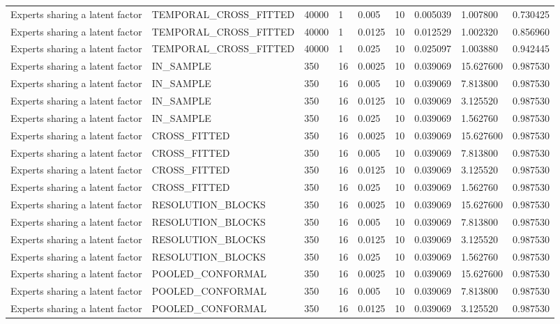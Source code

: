 \begin{tabular}{lllllllll}
Experts sharing a latent factor & TEMPORAL\_CROSS\_FITTED & 40000 & 1 & 0.005 & 10 & 0.005039 & 1.007800 & 0.730425 \\
Experts sharing a latent factor & TEMPORAL\_CROSS\_FITTED & 40000 & 1 & 0.0125 & 10 & 0.012529 & 1.002320 & 0.856960 \\
Experts sharing a latent factor & TEMPORAL\_CROSS\_FITTED & 40000 & 1 & 0.025 & 10 & 0.025097 & 1.003880 & 0.942445 \\
Experts sharing a latent factor & IN\_SAMPLE & 350 & 16 & 0.0025 & 10 & 0.039069 & 15.627600 & 0.987530 \\
Experts sharing a latent factor & IN\_SAMPLE & 350 & 16 & 0.005 & 10 & 0.039069 & 7.813800 & 0.987530 \\
Experts sharing a latent factor & IN\_SAMPLE & 350 & 16 & 0.0125 & 10 & 0.039069 & 3.125520 & 0.987530 \\
Experts sharing a latent factor & IN\_SAMPLE & 350 & 16 & 0.025 & 10 & 0.039069 & 1.562760 & 0.987530 \\
Experts sharing a latent factor & CROSS\_FITTED & 350 & 16 & 0.0025 & 10 & 0.039069 & 15.627600 & 0.987530 \\
Experts sharing a latent factor & CROSS\_FITTED & 350 & 16 & 0.005 & 10 & 0.039069 & 7.813800 & 0.987530 \\
Experts sharing a latent factor & CROSS\_FITTED & 350 & 16 & 0.0125 & 10 & 0.039069 & 3.125520 & 0.987530 \\
Experts sharing a latent factor & CROSS\_FITTED & 350 & 16 & 0.025 & 10 & 0.039069 & 1.562760 & 0.987530 \\
Experts sharing a latent factor & RESOLUTION\_BLOCKS & 350 & 16 & 0.0025 & 10 & 0.039069 & 15.627600 & 0.987530 \\
Experts sharing a latent factor & RESOLUTION\_BLOCKS & 350 & 16 & 0.005 & 10 & 0.039069 & 7.813800 & 0.987530 \\
Experts sharing a latent factor & RESOLUTION\_BLOCKS & 350 & 16 & 0.0125 & 10 & 0.039069 & 3.125520 & 0.987530 \\
Experts sharing a latent factor & RESOLUTION\_BLOCKS & 350 & 16 & 0.025 & 10 & 0.039069 & 1.562760 & 0.987530 \\
Experts sharing a latent factor & POOLED\_CONFORMAL & 350 & 16 & 0.0025 & 10 & 0.039069 & 15.627600 & 0.987530 \\
Experts sharing a latent factor & POOLED\_CONFORMAL & 350 & 16 & 0.005 & 10 & 0.039069 & 7.813800 & 0.987530 \\
Experts sharing a latent factor & POOLED\_CONFORMAL & 350 & 16 & 0.0125 & 10 & 0.039069 & 3.125520 & 0.987530 \\

\end{tabular}
